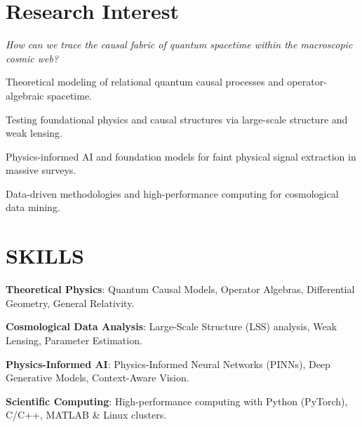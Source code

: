 \begin{minipage}[t]{0.5\textwidth}
\section{Research Interest}

{

\cvBulletListStart
  \item[-] \raggedright\textit{How can we trace the causal fabric of quantum spacetime within the macroscopic cosmic web?}
  \vspace{2mm}
  \item \raggedright{Theoretical modeling of relational quantum causal processes and operator-algebraic spacetime.}
  \vspace{1mm}
  \item \raggedright{Testing foundational physics and causal structures via large-scale structure and weak lensing.}
  \vspace{1mm}
  \item \raggedright{Physics-informed AI and foundation models for faint physical signal extraction in massive surveys.}
  \vspace{1mm}
  \item \raggedright{Data-driven methodologies and high-performance computing for cosmological data mining.}
\cvBulletListEnd

}

\end{minipage}
\hfill
\begin{minipage}[t]{0.48\textwidth}
\section{SKILLS}
\cvBulletListStart
  \item \textbf{Theoretical Physics}: Quantum Causal Models, Operator Algebras, Differential Geometry, General Relativity.
  \vspace{2mm}
  \item \textbf{Cosmological Data Analysis}: Large-Scale Structure (LSS) analysis, Weak Lensing, Parameter Estimation.
  \vspace{2mm}
  \item \textbf{Physics-Informed AI}: Physics-Informed Neural Networks (PINNs), Deep Generative Models, Context-Aware Vision.
  \vspace{2mm}
  \item \textbf{Scientific Computing}: High-performance computing with Python (PyTorch), C/C++, MATLAB \& Linux clusters.
\cvBulletListEnd
\end{minipage}
\vspace{-2mm}%